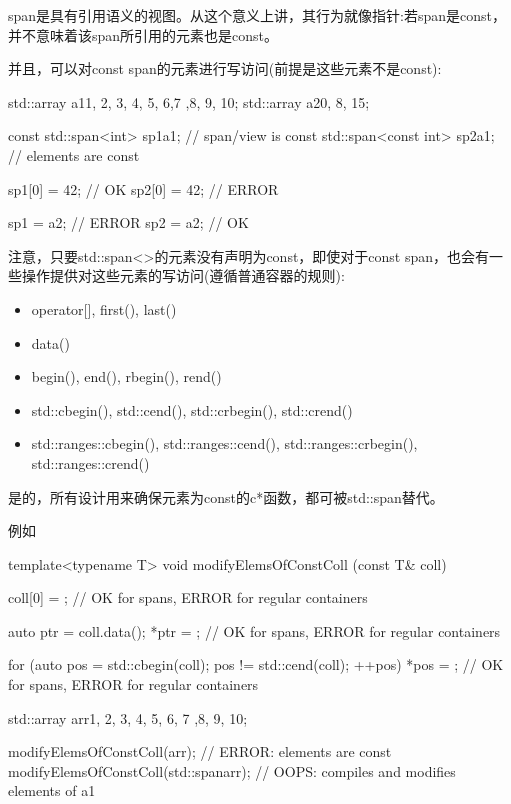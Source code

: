 span是具有引用语义的视图。从这个意义上讲，其行为就像指针:若span是const，并不意味着该span所引用的元素也是const。

并且，可以对const span的元素进行写访问(前提是这些元素不是const):

\begin{cpp}
std::array a1{1, 2, 3, 4, 5, 6,7 ,8, 9, 10};
std::array a2{0, 8, 15};

const std::span<int> sp1{a1}; // span/view is const
std::span<const int> sp2{a1}; // elements are const

sp1[0] = 42; // OK
sp2[0] = 42; // ERROR

sp1 = a2; // ERROR
sp2 = a2; // OK
\end{cpp}

注意，只要std::span<>的元素没有声明为const，即使对于const span，也会有一些操作提供对这些元素的写访问(遵循普通容器的规则):

\begin{itemize}
\item
operator[], first(), last()

\item
data()

\item
begin(), end(), rbegin(), rend()

\item
std::cbegin(), std::cend(), std::crbegin(), std::crend()

\item
std::ranges::cbegin(), std::ranges::cend(), std::ranges::crbegin(), std::ranges::crend()
\end{itemize}

是的，所有设计用来确保元素为const的c*函数，都可被std::span替代。

例如

\begin{cpp}
template<typename T>
void modifyElemsOfConstColl (const T& coll)
{
	coll[0] = {}; // OK for spans, ERROR for regular containers
	
	auto ptr = coll.data();
	*ptr = {}; // OK for spans, ERROR for regular containers
	
	for (auto pos = std::cbegin(coll); pos != std::cend(coll); ++pos) {
		*pos = {}; // OK for spans, ERROR for regular containers
	}
}

std::array arr{1, 2, 3, 4, 5, 6, 7 ,8, 9, 10};

modifyElemsOfConstColl(arr); // ERROR: elements are const
modifyElemsOfConstColl(std::span{arr}); // OOPS: compiles and modifies elements of a1
\end{cpp}

